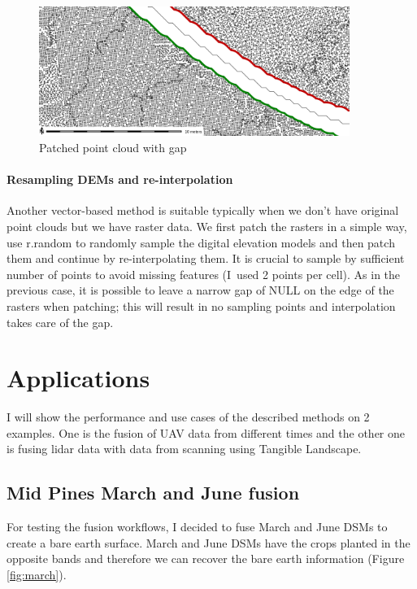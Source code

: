 \documentclass[a4paper,10pt]{article}
\begin{document}
\begin{figure}
	\centering
        \includegraphics[width=0.9\textwidth]{img/points.png}
	\caption{Patched point cloud with gap}
	\label{fig:points}
\end{figure}

\paragraph*{Resampling DEMs and re-interpolation}
Another vector-based method is suitable typically when we don't have original
point clouds but we have raster data. We first patch the rasters in a simple way,
use r.random to randomly sample the digital elevation models and then patch them
and continue by re-interpolating them.
It is crucial to sample by sufficient number of points to avoid missing features
(I~used 2 points per cell).
As in the previous case, it is possible to leave a narrow gap of NULL
on the edge of the rasters when patching; this will result in no sampling points
and interpolation takes care of the gap.



\section*{Applications}

I will show the performance and use cases of the described
methods on 2 examples. One is the fusion of UAV data from different times
and the other one is fusing lidar data with data from scanning using 
Tangible Landscape.

\subsection*{Mid Pines March and June fusion}
For testing the fusion workflows, I decided to fuse
March and June DSMs to create a bare earth surface. 
March and June DSMs have the crops planted in the opposite bands
and therefore we can recover the bare earth information (Figure \ref{fig:march}).
\end{document}

